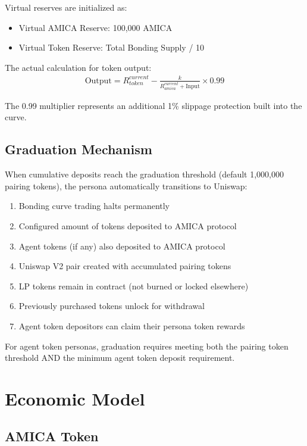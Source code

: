 \documentclass{article}
\begin{document}
Virtual reserves are initialized as:
\begin{itemize}
    \item Virtual AMICA Reserve: 100,000 AMICA
    \item Virtual Token Reserve: Total Bonding Supply / 10
\end{itemize}

The actual calculation for token output:
\begin{align}
\text{Output} = R_{token}^{current} - \frac{k}{R_{amica}^{current} + \text{Input}} \times 0.99
\end{align}

The 0.99 multiplier represents an additional 1\% slippage protection built into the curve.

\subsection{Graduation Mechanism}

When cumulative deposits reach the graduation threshold (default 1,000,000 pairing tokens), the persona automatically transitions to Uniswap:

\begin{enumerate}
    \item Bonding curve trading halts permanently
    \item Configured amount of tokens deposited to AMICA protocol
    \item Agent tokens (if any) also deposited to AMICA protocol
    \item Uniswap V2 pair created with accumulated pairing tokens
    \item LP tokens remain in contract (not burned or locked elsewhere)
    \item Previously purchased tokens unlock for withdrawal
    \item Agent token depositors can claim their persona token rewards
\end{enumerate}

For agent token personas, graduation requires meeting both the pairing token threshold AND the minimum agent token deposit requirement.

\section{Economic Model}

\subsection{AMICA Token}
\end{document}
